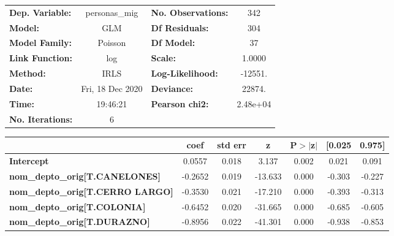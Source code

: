 \begin{center}
\begin{tabular}{lclc}
\toprule
\textbf{Dep. Variable:}                     &  personas\_mig   & \textbf{  No. Observations:  } &      342    \\
\textbf{Model:}                             &       GLM        & \textbf{  Df Residuals:      } &      304    \\
\textbf{Model Family:}                      &     Poisson      & \textbf{  Df Model:          } &       37    \\
\textbf{Link Function:}                     &       log        & \textbf{  Scale:             } &    1.0000   \\
\textbf{Method:}                            &       IRLS       & \textbf{  Log-Likelihood:    } &   -12551.   \\
\textbf{Date:}                              & Fri, 18 Dec 2020 & \textbf{  Deviance:          } &    22874.   \\
\textbf{Time:}                              &     19:46:21     & \textbf{  Pearson chi2:      } &  2.48e+04   \\
\textbf{No. Iterations:}                    &        6         & \textbf{                     } &             \\
\bottomrule
\end{tabular}
\begin{tabular}{lcccccc}
                                            & \textbf{coef} & \textbf{std err} & \textbf{z} & \textbf{P$> |$z$|$} & \textbf{[0.025} & \textbf{0.975]}  \\
\midrule
\textbf{Intercept}                          &       0.0557  &        0.018     &     3.137  &         0.002        &        0.021    &        0.091     \\
\textbf{nom\_depto\_orig[T.CANELONES]}      &      -0.2652  &        0.019     &   -13.633  &         0.000        &       -0.303    &       -0.227     \\
\textbf{nom\_depto\_orig[T.CERRO LARGO]}    &      -0.3530  &        0.021     &   -17.210  &         0.000        &       -0.393    &       -0.313     \\
\textbf{nom\_depto\_orig[T.COLONIA]}        &      -0.6452  &        0.020     &   -31.665  &         0.000        &       -0.685    &       -0.605     \\
\textbf{nom\_depto\_orig[T.DURAZNO]}        &      -0.8956  &        0.022     &   -41.301  &         0.000        &       -0.938    &       -0.853     \\

\end{tabular}
\end{center}

